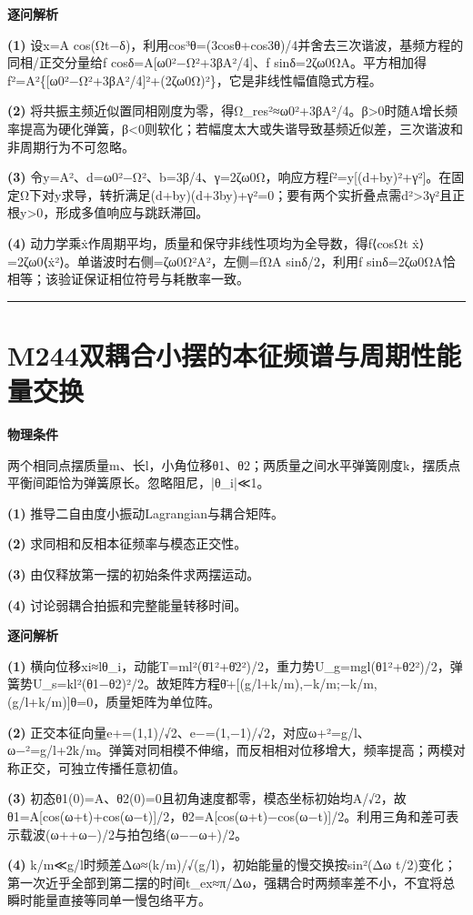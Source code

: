 \documentclass[UTF8,a4paper,11pt,oneside,openany]{ctexbook}
\begin{document}
\par\medskip\noindent\textbf{逐问解析}
\par\noindent\textbf{(1)} 设x=A cos(Ωt−δ)，利用cos³θ=(3cosθ+cos3θ)/4并舍去三次谐波，基频方程的同相/正交分量给f cosδ=A[ω0²−Ω²+3βA²/4]、f sinδ=2ζω0ΩA。平方相加得f²=A²\{[ω0²−Ω²+3βA²/4]²+(2ζω0Ω)²\}，它是非线性幅值隐式方程。
\par\noindent\textbf{(2)} 将共振主频近似置同相刚度为零，得Ω\_res²≈ω0²+3βA²/4。β>0时随A增长频率提高为硬化弹簧，β<0则软化；若幅度太大或失谐导致基频近似差，三次谐波和非周期行为不可忽略。
\par\noindent\textbf{(3)} 令y=A²、d=ω0²−Ω²、b=3β/4、γ=2ζω0Ω，响应方程f²=y[(d+by)²+γ²]。在固定Ω下对y求导，转折满足(d+by)(d+3by)+γ²=0；要有两个实折叠点需d²>3γ²且正根y>0，形成多值响应与跳跃滞回。
\par\noindent\textbf{(4)} 动力学乘ẋ作周期平均，质量和保守非线性项均为全导数，得f⟨cosΩt ẋ⟩=2ζω0⟨ẋ²⟩。单谐波时右侧=ζω0Ω²A²，左侧=fΩA sinδ/2，利用f sinδ=2ζω0ΩA恰相等；该验证保证相位符号与耗散率一致。

\par\bigskip\hrule\bigskip
\section*{M244\quad 双耦合小摆的本征频谱与周期性能量交换}
\textbf{物理条件}\par 两个相同点摆质量m、长l，小角位移θ1、θ2；两质量之间水平弹簧刚度k，摆质点平衡间距恰为弹簧原长。忽略阻尼，|θ\_i|≪1。
\par\noindent\textbf{(1)} 推导二自由度小振动Lagrangian与耦合矩阵。
\par\noindent\textbf{(2)} 求同相和反相本征频率与模态正交性。
\par\noindent\textbf{(3)} 由仅释放第一摆的初始条件求两摆运动。
\par\noindent\textbf{(4)} 讨论弱耦合拍振和完整能量转移时间。

\par\medskip\noindent\textbf{逐问解析}
\par\noindent\textbf{(1)} 横向位移xi≈lθ\_i，动能T=ml²(θ̇1²+θ̇2²)/2，重力势U\_g=mgl(θ1²+θ2²)/2，弹簧势U\_s=kl²(θ1−θ2)²/2。故矩阵方程θ̈+[(g/l+k/m),−k/m;−k/m,(g/l+k/m)]θ=0，质量矩阵为单位阵。
\par\noindent\textbf{(2)} 正交本征向量e+=(1,1)/√2、e−=(1,−1)/√2，对应ω+²=g/l、ω−²=g/l+2k/m。弹簧对同相模不伸缩，而反相相对位移增大，频率提高；两模对称正交，可独立传播任意初值。
\par\noindent\textbf{(3)} 初态θ1(0)=A、θ2(0)=0且初角速度都零，模态坐标初始均A/√2，故θ1=A[cos(ω+t)+cos(ω−t)]/2，θ2=A[cos(ω+t)−cos(ω−t)]/2。利用三角和差可表示载波(ω++ω−)/2与拍包络(ω−−ω+)/2。
\par\noindent\textbf{(4)} k/m≪g/l时频差Δω≈(k/m)/√(g/l)，初始能量的慢交换按sin²(Δω t/2)变化；第一次近乎全部到第二摆的时间t\_ex≈π/Δω，强耦合时两频率差不小，不宜将总瞬时能量直接等同单一慢包络平方。
\end{document}
